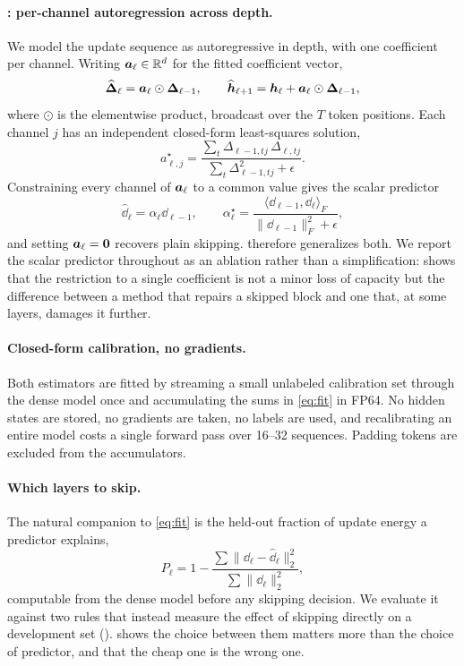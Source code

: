 \paragraph{\mname: per-channel autoregression across depth.} We model the update
sequence as autoregressive in depth, with one coefficient per channel. Writing
$\bm{a}_\ell \in \mathbb{R}^{d}$ for the fitted coefficient vector,
\begin{equation}
\widehat{\bm{\Delta}}_\ell = \bm{a}_\ell \odot \bm{\Delta}_{\ell-1},
\qquad
\widehat{\bm{h}}_{\ell+1} = \bm{h}_\ell + \bm{a}_\ell \odot \bm{\Delta}_{\ell-1},
\label{eq:diag}
\end{equation}
where $\odot$ is the elementwise product, broadcast over the $T$ token positions.
Each channel $j$ has an independent closed-form least-squares solution,
\begin{equation}
a^{\star}_{\ell,j} =
\frac{\sum_t \Delta_{\ell-1,tj}\,\Delta_{\ell,tj}}
     {\sum_t \Delta_{\ell-1,tj}^{2} + \epsilon}.
\label{eq:fit}
\end{equation}
Constraining every channel of $\bm{a}_\ell$ to a common value gives the scalar
predictor
\begin{equation}
\widehat{\dd}_\ell = \alpha_\ell \dd_{\ell-1},
\qquad
\alpha^{\star}_\ell =
\frac{\langle \dd_{\ell-1}, \dd_\ell \rangle_F}
     {\|\dd_{\ell-1}\|_F^2 + \epsilon},
\label{eq:ar1}
\end{equation}
and setting $\bm{a}_\ell = \bm{0}$ recovers plain skipping. \mname therefore
generalizes both. We report the scalar predictor throughout as an ablation rather
than a simplification:  shows that the restriction to a
single coefficient is not a minor loss of capacity but the difference between a
method that repairs a skipped block and one that, at some layers, damages it
further.

\paragraph{Closed-form calibration, no gradients.} Both estimators are fitted by
streaming a small unlabeled calibration set through the dense model once and
accumulating the sums in \cref{eq:fit} in FP64. No hidden states are stored, no
gradients are taken, no labels are used, and recalibrating an entire model costs a
single forward pass over 16--32 sequences. Padding tokens are excluded from
the accumulators.

\paragraph{Which layers to skip.} The natural companion to \cref{eq:fit} is the held-out
fraction of update energy a predictor explains,
\begin{equation}
P_\ell = 1 - \frac{\sum \|\dd_\ell - \widehat{\dd}_\ell\|_2^2}{\sum \|\dd_\ell\|_2^2},
\label{eq:pscore}
\end{equation}
computable from the dense model before any skipping decision. We evaluate it against two rules
that instead measure the effect of skipping directly on a development set
().  shows the choice between them matters more
than the choice of predictor, and that the cheap one is the wrong one.

